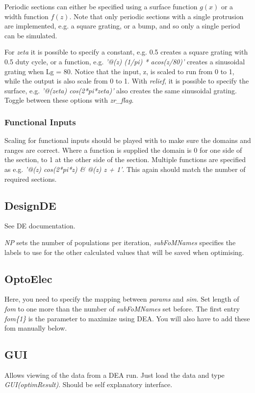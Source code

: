 \documentclass[]{article}  %
\begin{document}
Periodic sections can either be specified using a surface function $g(x)$ or a width function $f(z)$. Note that only periodic sections with a single protrusion are implemented, e.g. a square grating, or a bump, and so only a single period can be simulated.

For \emph{zeta} it is possible to specify a constant, e.g. 0.5 creates a square grating with 0.5 duty cycle, or a function, e.g. \emph{'@(z) (1/pi) * acos(z/80)'} creates a sinusoidal grating when Lg = 80. Notice that the input, z, is scaled to run from 0 to 1, while the output is also scale from 0 to 1. With \emph{relief}, it is possible to specify the surface, e.g. \emph{'@(zeta) cos(2*pi*zeta)'} also creates the same sinusoidal grating. Toggle between these options with \emph{zr\_flag}.

\subsubsection{Functional Inputs}
Scaling for functional inputs should be played with to make sure the domains and ranges are correct. Where a function is supplied the domain is 0 for one side of the section, to 1 at the other side of the section. Multiple functions are specified as e.g. \emph{'@(z) cos(2*pi*z) \& @(z) z + 1'}. This again should match the number of required sections.

\subsection{DesignDE}
See DE documentation.

\emph{NP} sets the number of populations per iteration, \emph{subFoMNames} specifies the labels to use for the other calculated values that will be saved when optimising.


\subsection{OptoElec}
Here, you need to specify the mapping between \emph{params} and \emph{sim}. Set length of \emph{fom} to one more than the number of \emph{subFoMNames} set before. The first entry \emph{fom\{1\}} is the parameter to maximize using DEA. You will also have to add these fom manually below.


\subsection{GUI}
Allows viewing of the data from a DEA run. Just load the data and type \emph{GUI(optimResult)}. Should be self explanatory interface.
\end{document}
